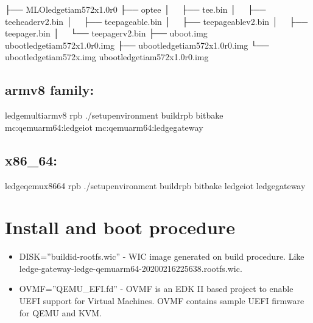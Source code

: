 \documentclass[a4paper,10pt,oneside,english]{sphinxmanual}
\begin{document}
\begin{sphinxVerbatim}[commandchars=\\\{\}]
    ├── MLO\PYGZhy{}ledge\PYGZhy{}ti\PYGZhy{}am572x\PYGZhy{}1.0\PYGZhy{}r0
    ├── optee
    │   ├── tee.bin
    │   ├── tee\PYGZhy{}header\PYGZus{}v2.bin
    │   ├── tee\PYGZhy{}pageable.bin
    │   ├── tee\PYGZhy{}pageable\PYGZus{}v2.bin
    │   ├── tee\PYGZhy{}pager.bin
    │   └── tee\PYGZhy{}pager\PYGZus{}v2.bin
    ├── u\PYGZhy{}boot.img \PYGZhy{}\PYGZgt{} u\PYGZhy{}boot\PYGZhy{}ledge\PYGZhy{}ti\PYGZhy{}am572x\PYGZhy{}1.0\PYGZhy{}r0.img
    ├── u\PYGZhy{}boot\PYGZhy{}ledge\PYGZhy{}ti\PYGZhy{}am572x\PYGZhy{}1.0\PYGZhy{}r0.img
    └── u\PYGZhy{}boot\PYGZhy{}ledge\PYGZhy{}ti\PYGZhy{}am572x.img \PYGZhy{}\PYGZgt{} u\PYGZhy{}boot\PYGZhy{}ledge\PYGZhy{}ti\PYGZhy{}am572x\PYGZhy{}1.0\PYGZhy{}r0.img
\end{sphinxVerbatim}


\subsection{armv8 family:}
\label{\detokenize{chapter2-oe:armv8-family}}
\begin{sphinxVerbatim}[commandchars=\\\{\}]
ledge\PYGZhy{}multi\PYGZhy{}armv8 rpb  ./setup\PYGZhy{}environment build\PYGZhy{}rpb
bitbake mc:qemuarm64:ledge\PYGZhy{}iot mc:qemuarm64:ledge\PYGZhy{}gateway 
\end{sphinxVerbatim}


\subsection{x86\_64:}
\label{\detokenize{chapter2-oe:x86-64}}
\begin{sphinxVerbatim}[commandchars=\\\{\}]
ledge\PYGZhy{}qemux86\PYGZhy{}64 rpb  ./setup\PYGZhy{}environment build\PYGZhy{}rpb
bitbake ledge\PYGZhy{}iot ledge\PYGZhy{}gateway
\end{sphinxVerbatim}


\section{Install and boot procedure}
\label{\detokenize{chapter2-oe:install-and-boot-procedure}}\begin{itemize}
\item {} 
DISK=”buildid-rootfs.wic”  - WIC image generated on build procedure. Like ledge-gateway-ledge-qemuarm64-20200216225638.rootfs.wic.

\item {} 
OVMF=”QEMU\_EFI.fd” - OVMF is an EDK II based project to enable UEFI support for Virtual Machines. OVMF contains sample UEFI firmware for QEMU and KVM.

\end{itemize}
\end{document}
